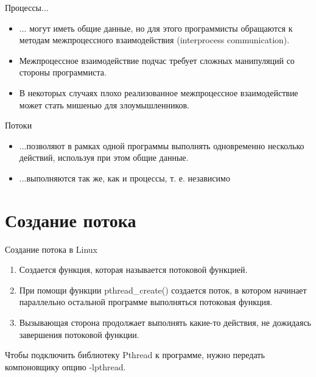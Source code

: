 \documentclass{beamer}
\begin{document}
\begin{frame}
\begin{block}{Процессы...}
\begin{itemize}
\item ... могут иметь общие данные, но для этого программисты обращаются к методам межпроцессного взаимодействия (interprocess communication). 
\item Межпроцессное взаимодействие подчас требует сложных манипуляций со стороны программиста.
\item В некоторых случаях плохо реализованное межпроцессное взаимодействие может стать мишенью для злоумышленников.
\end{itemize}
\end{block}
\begin{block}{Потоки}
\begin{itemize}
\item ...позволяют в рамках одной программы выполнять одновременно несколько
действий, используя при этом общие данные. 
\item ...выполняются так же, как и процессы, т. е. независимо
\end{itemize}
\end{block}
\end{frame}

\section{Создание потока}

\begin{frame}{Создание потока в Linux}
\begin{enumerate}
\item Создается функция, которая называется потоковой функцией.
\item При помощи функции pthread\_create() создается поток, в котором начинает параллельно остальной программе выполняться потоковая функция.
\item Вызывающая сторона продолжает выполнять какие-то действия, не дожидаясь завершения потоковой функции.
\end{enumerate}
Чтобы подключить библиотеку Pthread к программе, нужно передать компоновщику опцию -lpthread.
\end{frame}
\end{document}
